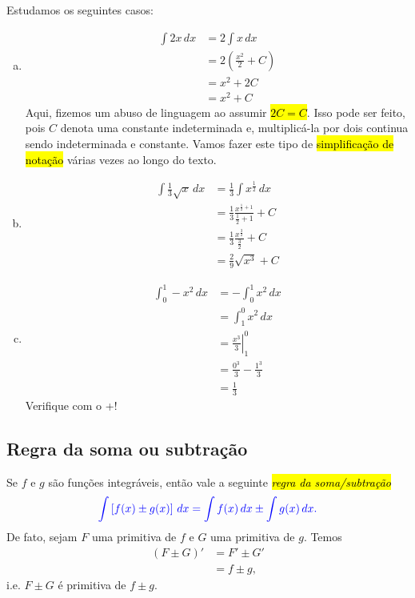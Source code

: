 \begin{ex}
  Estudamos os seguintes casos:
  \begin{enumerate}[a)]
  \item
    \begin{align}
      \int 2x\,dx &= 2\int x\,dx\\
                  &= 2\left(\frac{x^2}{2} + C\right)\\
                  &= x^2 + 2C\\
                  &= x^2 + C
    \end{align}
    Aqui, fizemos um abuso de linguagem ao assumir \hl{$2C = C$}. Isso pode ser feito, pois $C$ denota uma constante indeterminada e, multiplicá-la por dois continua sendo indeterminada e constante. Vamos fazer este tipo de \hl{simplificação de notação} várias vezes ao longo do texto.
  \item
    \begin{align}
      \int \frac{1}{3}\sqrt{x}\,dx &= \frac{1}{3}\int x^{\frac{1}{2}}\,dx\\
                                   &= \frac{1}{3}\frac{x^{\frac{1}{2}+1}}{\frac{1}{2}+1} + C\\
                                   &= \frac{1}{3}\frac{x^{\frac{3}{2}}}{\frac{3}{2}} + C\\
                                   &= \frac{2}{9}\sqrt{x^3} + C
    \end{align}
  \item
    \begin{align}
      \int_0^{1}-x^2\,dx &= -\int_0^1x^2\,dx\\
                         &= \int_1^0 x^2\,dx\\
                         &= \left.\frac{x^3}{3}\right|_1^0\\
                         &= \frac{0^3}{3} - \frac{1^3}{3}\\
                         &= \frac{1}{3}
    \end{align}
    \ifispython
    Verifique com o {\python}+{\sympy}!
    \fi
  \end{enumerate}
\end{ex}

\subsection{Regra da soma ou subtração}

Se $f$ e $g$ são funções integráveis, então vale a seguinte \hl{\emph{regra da soma/subtração}}
\begin{equation}\color{blue}\int \left[f(x)\pm g(x)\right]\,dx = \int f(x)\,dx \pm \int g(x)\,dx.
\end{equation}
De fato, sejam $F$ uma primitiva de $f$ e $G$ uma primitiva de $g$. Temos
\begin{align}
  (F \pm G)' &= F' \pm G'\\
             &= f \pm g,
\end{align}
i.e. $F \pm G$ é primitiva de $f\pm g$.

